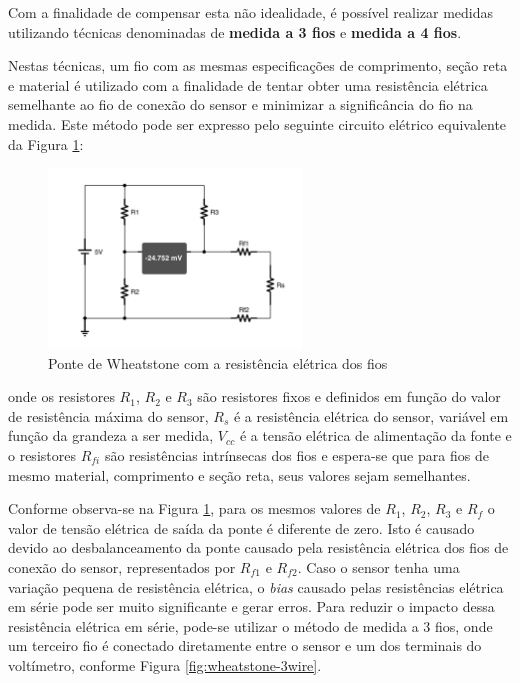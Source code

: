 \documentclass[a4paper]{instrumentacao}
\begin{document}
Com a finalidade de compensar esta não idealidade, é possível realizar medidas utilizando técnicas denominadas de \textbf{medida a 3 fios} e \textbf{medida a 4 fios}.

Nestas técnicas, um fio com as mesmas especificações de comprimento, seção reta e material é utilizado com a finalidade de tentar obter uma resistência elétrica semelhante ao fio de conexão do sensor e minimizar a significância do fio na medida. Este método pode ser expresso pelo seguinte circuito elétrico equivalente da Figura \ref{fig:wheatstone-wire-model}:

\begin{figure}[H]
\centering
\includegraphics[width=0.6\textwidth]{Wheatstone-Bridge-WiresModel.pdf}
\caption{Ponte de Wheatstone com a resistência elétrica dos fios}
\label{fig:wheatstone-wire-model}
\end{figure}

\noindent onde os resistores $R_1$, $R_2$ e $R_3$ são resistores fixos e definidos em função do valor de resistência máxima do sensor, $R_s$ é a resistência elétrica do sensor, variável em função da grandeza a ser medida, $V_{cc}$ é a tensão elétrica de alimentação da fonte e o resistores $R_{fi}$ são resistências intrínsecas dos fios e espera-se que para fios de mesmo material, comprimento e seção reta, seus valores sejam semelhantes.

Conforme observa-se na Figura \ref{fig:wheatstone-wire-model}, para os mesmos valores de $R_1$, $R_2$, $R_3$ e $R_f$ o valor de tensão elétrica de saída da ponte é diferente de zero. Isto é causado devido ao desbalanceamento da ponte causado pela resistência elétrica dos fios de conexão do sensor, representados por $R_{f1}$ e $R_{f2}$. Caso o sensor tenha uma variação pequena de resistência elétrica, o \textit{bias} causado pelas resistências elétrica em série pode ser muito significante e gerar erros. Para reduzir o impacto dessa resistência elétrica em série, pode-se utilizar o método de medida a 3 fios, onde um terceiro fio é conectado diretamente entre o sensor e um dos terminais do voltímetro, conforme Figura \ref{fig:wheatstone-3wire}.
\end{document}
